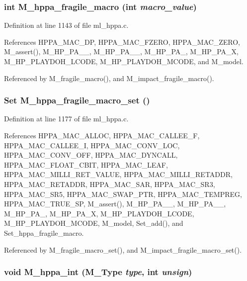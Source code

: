 \subsubsection{\setlength{\rightskip}{0pt plus 5cm}int M\_\-hppa\_\-fragile\_\-macro (int {\em macro\_\-value})}\label{m__hppa_8h_3014f9b711fa96e603622a27d431a97a}




Definition at line 1143 of file ml\_\-hppa.c.

References HPPA\_\-MAC\_\-DP, HPPA\_\-MAC\_\-FZERO, HPPA\_\-MAC\_\-ZERO, M\_\-assert(), M\_\-HP\_\-PA\_\_, M\_\-HP\_\-PA\_\_, M\_\-HP\_\-PA\_, M\_\-HP\_\-PA\_\-X, M\_\-HP\_\-PLAYDOH\_\-LCODE, M\_\-HP\_\-PLAYDOH\_\-MCODE, and M\_\-model.

Referenced by M\_\-fragile\_\-macro(), and M\_\-impact\_\-fragile\_\-macro().
\subsubsection{\setlength{\rightskip}{0pt plus 5cm}\bf{Set} M\_\-hppa\_\-fragile\_\-macro\_\-set ()}\label{m__hppa_8h_edcedf3decd672a9794788983658d9de}




Definition at line 1177 of file ml\_\-hppa.c.

References HPPA\_\-MAC\_\-ALLOC, HPPA\_\-MAC\_\-CALLEE\_\-F, HPPA\_\-MAC\_\-CALLEE\_\-I, HPPA\_\-MAC\_\-CONV\_\-LOC, HPPA\_\-MAC\_\-CONV\_\-OFF, HPPA\_\-MAC\_\-DYNCALL, HPPA\_\-MAC\_\-FLOAT\_\-CBIT, HPPA\_\-MAC\_\-LEAF, HPPA\_\-MAC\_\-MILLI\_\-RET\_\-VALUE, HPPA\_\-MAC\_\-MILLI\_\-RETADDR, HPPA\_\-MAC\_\-RETADDR, HPPA\_\-MAC\_\-SAR, HPPA\_\-MAC\_\-SR3, HPPA\_\-MAC\_\-SR5, HPPA\_\-MAC\_\-SWAP\_\-PTR, HPPA\_\-MAC\_\-TEMPREG, HPPA\_\-MAC\_\-TRUE\_\-SP, M\_\-assert(), M\_\-HP\_\-PA\_\_, M\_\-HP\_\-PA\_\_, M\_\-HP\_\-PA\_, M\_\-HP\_\-PA\_\-X, M\_\-HP\_\-PLAYDOH\_\-LCODE, M\_\-HP\_\-PLAYDOH\_\-MCODE, M\_\-model, Set\_\-add(), and Set\_\-hppa\_\-fragile\_\-macro.

Referenced by M\_\-fragile\_\-macro\_\-set(), and M\_\-impact\_\-fragile\_\-macro\_\-set().
\subsubsection{\setlength{\rightskip}{0pt plus 5cm}void M\_\-hppa\_\-int (\bf{M\_\-Type} {\em type}, int {\em unsign})}\label{m__hppa_8h_cf3c52d4ccc36af063ed710e8cd30621}




